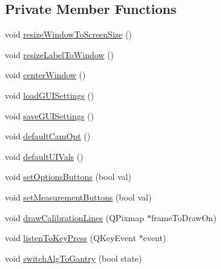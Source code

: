 \subsection*{Private Member Functions}
\begin{DoxyCompactItemize}
\item 
void \mbox{\hyperlink{class_main_window_abf8d2aa0872c2072510bc93f9f9e4d11}{resize\+Window\+To\+Screen\+Size}} ()
\item 
void \mbox{\hyperlink{class_main_window_a5e7a591198f61ccccbd9608a519dcd01}{resize\+Label\+To\+Window}} ()
\item 
void \mbox{\hyperlink{class_main_window_a775d79cb8170d36faf4aa9ce4570d8b3}{center\+Window}} ()
\item 
void \mbox{\hyperlink{class_main_window_ad0f8d1384a86ac65b996addd300ef620}{load\+G\+U\+I\+Settings}} ()
\item 
void \mbox{\hyperlink{class_main_window_a0806c678c7280ab0a786526522f91418}{save\+G\+U\+I\+Settings}} ()
\item 
void \mbox{\hyperlink{class_main_window_ad6c3df0bfe7f2357d3f2083e20e3810a}{default\+Cam\+Opt}} ()
\item 
void \mbox{\hyperlink{class_main_window_a6021f4624cf5aa8ced6b210d388ac31d}{default\+U\+I\+Vals}} ()
\item 
void \mbox{\hyperlink{class_main_window_a47326e5f671c05053baaa75a2a4059e7}{set\+Options\+Buttons}} (bool val)
\item 
void \mbox{\hyperlink{class_main_window_aa6af159870a097c8347efae3a7c26e6f}{set\+Measurement\+Buttons}} (bool val)
\item 
void \mbox{\hyperlink{class_main_window_a46d10bf790a404b85083416112d51c08}{draw\+Calibration\+Lines}} (Q\+Pixmap $\ast$frame\+To\+Draw\+On)
\item 
void \mbox{\hyperlink{class_main_window_a1bc0cb9910e8898744ff85e8326bf73d}{listen\+To\+Key\+Press}} (Q\+Key\+Event $\ast$event)
\item 
void \mbox{\hyperlink{class_main_window_a28c0f3e2856ce2c44ba3ddad62a302a6}{switch\+Alg\+To\+Gantry}} (bool state)
\end{DoxyCompactItemize}
